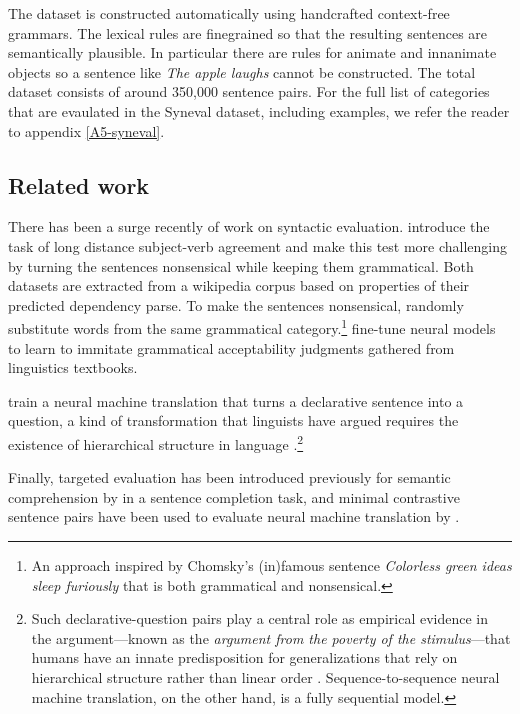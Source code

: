   The dataset is constructed automatically using handcrafted context-free grammars. The lexical rules are finegrained so that the resulting sentences are semantically plausible. In particular there are rules for animate and innanimate objects so a sentence like \textit{The apple laughs} cannot be constructed. The total dataset consists of around 350,000 sentence pairs. For the full list of categories that are evaulated in the Syneval dataset, including examples, we refer the reader to appendix \ref{A5-syneval}.

\subsection{Related work}
  There has been a surge recently of work on syntactic evaluation. \citet{linzen2016syntax} introduce the task of long distance subject-verb agreement and \citet{gulordava2018colorless} make this test more challenging by turning the sentences nonsensical while keeping them grammatical. Both datasets are extracted from a wikipedia corpus based on properties of their predicted dependency parse. To make the sentences nonsensical, \citet{gulordava2018colorless} randomly substitute words from the same grammatical category.\footnote{An approach inspired by Chomsky's (in)famous sentence \textit{Colorless green ideas sleep furiously} that is both grammatical and nonsensical.} \citet{warstadt2018acceptability} fine-tune neural models to learn to immitate grammatical acceptability judgments gathered from linguistics textbooks.

  \citet{mccoy2018revisiting} train a neural machine translation that turns a declarative sentence into a question, a kind of transformation that linguists have argued requires the existence of hierarchical structure in language \citep{everaert2015structures}.\footnote{Such declarative-question pairs play a central role as empirical evidence in the argument---known as the \textit{argument from the poverty of the stimulus}---that humans have an innate predisposition for generalizations that rely on hierarchical structure rather than linear order \citep{chomsky1980rules}. Sequence-to-sequence neural machine translation, on the other hand, is a fully sequential model.}

  Finally, targeted evaluation has been introduced previously for semantic comprehension by \citet{zweig2011microsoft} in a sentence completion task, and minimal contrastive sentence pairs have been used to evaluate neural machine translation by \citet{sennrich2017grammatical}.



